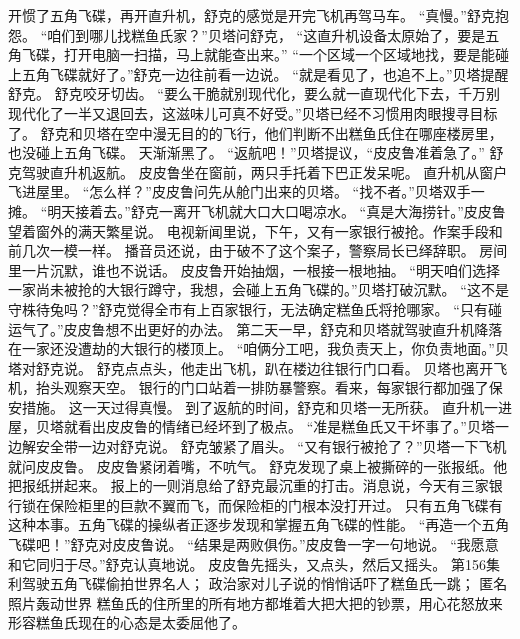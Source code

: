 \documentclass[a4paper,12pt,UTF8,twoside]{ctexbook}
\begin{document}
        开惯了五角飞碟，再开直升机，舒克的感觉是开完飞机再驾马车。 
        “真慢。”舒克抱怨。 
        “咱们到哪儿找糕鱼氏家？”贝塔问舒克，  “这直升机设备太原始了，要是五角飞碟，打开电脑一扫描，马上就能查出来。” 
        “一个区域一个区域地找，要是能碰上五角飞碟就好了。”舒克一边往前看一边说。 
        “就是看见了，也追不上。”贝塔提醒舒克。 
        舒克咬牙切齿。 
        “要么干脆就别现代化，要么就一直现代化下去，千万别现代化了一半又退回去，这滋味儿可真不好受。”贝塔已经不习惯用肉眼搜寻目标了。 
        舒克和贝塔在空中漫无目的的飞行，他们判断不出糕鱼氏住在哪座楼房里，也没碰上五角飞碟。 
        天渐渐黑了。 
        “返航吧！”贝塔提议，“皮皮鲁准着急了。” 
        舒克驾驶直升机返航。 
        皮皮鲁坐在窗前，两只手托着下巴正发呆呢。 
        直升机从窗户飞进屋里。 
        “怎么样？”皮皮鲁问先从舱门出来的贝塔。 
        “找不者。”贝塔双手一摊。 
        “明天接着去。”舒克一离开飞机就大口大口喝凉水。 
        “真是大海捞针。”皮皮鲁望着窗外的满天繁星说。 
        电视新闻里说，下午，又有一家银行被抢。作案手段和前几次一模一样。 
        播音员还说，由于破不了这个案子，警察局长已绎辞职。 
        房间里一片沉默，谁也不说话。 
        皮皮鲁开始抽烟，一根接一根地抽。 
        “明天咱们选择一家尚未被抢的大银行蹲守，我想，会碰上五角飞碟的。”贝塔打破沉默。 
        “这不是守株待兔吗？”舒克觉得全市有上百家银行，无法确定糕鱼氏将抢哪家。 
        “只有碰运气了。”皮皮鲁想不出更好的办法。 
        第二天一早，舒克和贝塔就驾驶直升机降落在一家还没遭劫的大银行的楼顶上。 
        “咱俩分工吧，我负责天上，你负责地面。”贝塔对舒克说。 
        舒克点点头，他走出飞机，趴在楼边往银行门口看。 
        贝塔也离开飞机，抬头观察天空。 
        银行的门口站着一排防暴警察。看来，每家银行都加强了保安措施。 
        这一天过得真慢。 
        到了返航的时间，舒克和贝塔一无所获。 
        直升机一进屋，贝塔就看出皮皮鲁的情绪已经坏到了极点。 
        “准是糕鱼氏又干坏事了。”贝塔一边解安全带一边对舒克说。 
        舒克皱紧了眉头。 
        “又有银行被抢了？”贝塔一下飞机就问皮皮鲁。 
        皮皮鲁紧闭着嘴，不吭气。 
        舒克发现了桌上被撕碎的一张报纸。他把报纸拼起来。 
        报上的一则消息给了舒克最沉重的打击。消息说，今天有三家银行锁在保险柜里的巨款不翼而飞，而保险柜的门根本没打开过。 
        只有五角飞碟有这种本事。五角飞碟的操纵者正逐步发现和掌握五角飞碟的性能。 
        “再造一个五角飞碟吧！”舒克对皮皮鲁说。 
        “结果是两败俱伤。”皮皮鲁一字一句地说。 
        “我愿意和它同归于尽。”舒克认真地说。 
        皮皮鲁先摇头，又点头，然后又摇头。   第156集 
        利驾驶五角飞碟偷拍世界名人； 
        政治家对儿子说的悄悄话吓了糕鱼氏一跳； 
        匿名照片轰动世界   
        糕鱼氏的住所里的所有地方都堆着大把大把的钞票，用心花怒放来形容糕鱼氏现在的心态是太委屈他了。 
\end{document}
